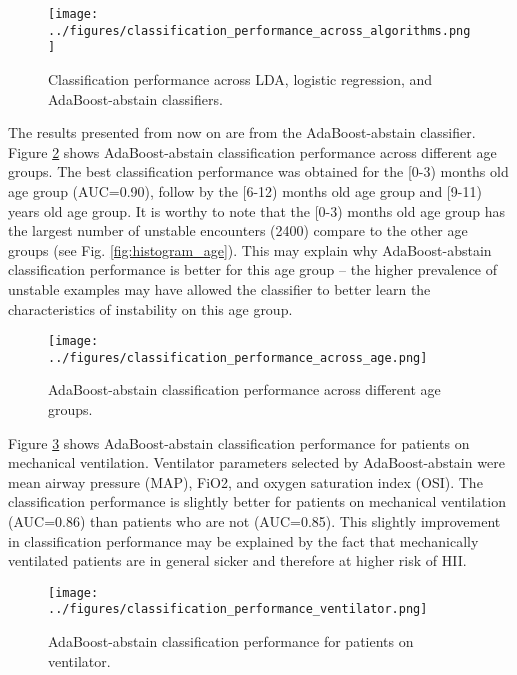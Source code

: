 \documentclass[
   technote
]{phildoc}
\newcommand{\hii}{HII}
\newcommand{\fig}{Fig.}
\newcommand{\mx}[1]{{\color{green}{MX: #1}}}
\begin{document}
\begin{figure}[ht!]
	\centering
	\texttt{[image: ../figures/classification\_performance\_across\_algorithms.png]}
	\caption{Classification performance across LDA, logistic regression, and AdaBoost-abstain classifiers.} 
	\label{fig:clf_across_algorithms}      
\end{figure}


The results presented from now on are from the AdaBoost-abstain classifier. Figure \ref{fig:clf_across_age} shows AdaBoost-abstain classification performance across different age groups. The best classification performance was obtained for the [0-3) months old age group (AUC=0.90), follow by the [6-12) months old age group and [9-11) years old age group. It is worthy to note that the [0-3) months old age group has the largest number of unstable encounters (2400) compare to the other age groups (see \fig{} \ref{fig:histogram_age}). This may explain why AdaBoost-abstain classification performance is better for this age group -- the higher prevalence of unstable examples may have allowed the classifier to better learn the characteristics of instability on this age group.   

\begin{figure}[h!]
	\centering
	\texttt{[image: ../figures/classification\_performance\_across\_age.png]}
	\caption{AdaBoost-abstain classification performance across different age groups.} 
	\label{fig:clf_across_age}      
\end{figure}

Figure \ref{fig:clf_ventilator} shows AdaBoost-abstain classification performance for patients on mechanical ventilation. Ventilator parameters selected by AdaBoost-abstain were mean airway pressure (MAP), FiO2, and oxygen saturation index (OSI). The classification performance is slightly better for patients on mechanical ventilation (AUC=0.86) than patients who are not (AUC=0.85). This slightly improvement in classification performance may be explained by the fact that mechanically ventilated patients are in general sicker and therefore at higher risk of \hii{}.  

\begin{figure}[h!]
	\centering
	\texttt{[image: ../figures/classification\_performance\_ventilator.png]}
	\caption{AdaBoost-abstain classification performance for patients on ventilator.} 
	\label{fig:clf_ventilator}      
\end{figure}
 
\end{document}
